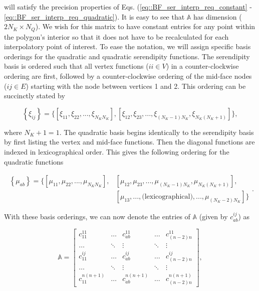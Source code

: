 \noindent will satisfy the precision properties of Eqs. (\ref{eq::BF_ser_interp_req_constant} - \ref{eq::BF_ser_interp_req_quadratic}). It is easy to see that $\mathbb{A}$ has dimension ($2 N_K \times N_Q$). We wish for this matrix to have constant entries for any point within the polygon's interior so that it does not have to be recalculated for each interpolatory point of interest. To ease the notation, we will assign specific basis orderings for the quadratic and quadratic serendipity functions. The serendipity basis is ordered such that all vertex functions ($ii \in V$) in a counter-clockwise ordering are first, followed by a counter-clockwise ordering of the mid-face nodes ($ij \in E$) starting with the node between vertices 1 and 2. This ordering can be succinctly stated by

\begin{equation}
\label{eq::BF_ser_ordering}
\left\{ \xi_{ij} \right\} = \Big\{ \left[  \xi_{11}, \xi_{22}, ... , \xi_{N_K N_K} \right] , \left[ \xi_{12}, \xi_{23}, ..., \xi_{(N_K-1)N_K}, \xi_{N_K(N_K+1)} \right] \Big\} ,
\end{equation}

\noindent where $N_K+1=1$. The quadratic basis begins identically to the serendipity basis by first listing the vertex and mid-face functions. Then the diagonal functions are indexed in lexicographical order. This gives the following ordering for the quadratic functions

\begin{equation}
\label{eq::BF_quad_ordering}
\begin{aligned}
\left\{ \mu_{ab} \right\} = \Big\{ \left[  \mu_{11}, \mu_{22}, ... , \mu_{N_K N_K} \right] , &\left[ \mu_{12}, \mu_{23}, ..., \mu_{(N_K-1)N_K}, \mu_{N_K(N_K+1)} \right] ,\\ 
&\left[ \mu_{13}, ..., \text{(lexicographical)} ,..., \mu_{(N_K-2)N_K} \right] \Big\} 
\end{aligned} .
\end{equation}

\noindent With these basis orderings, we can now denote the entries of $\mathbb{A}$ (given by $c_{ab}^{ij}$) as

\begin{equation}
\label{eq::BF_quad_to_ser_matrix_constraints}
\mathbb{A} = 
\left[
\begin{array}{ccccc}
c_{11}^{11} & \ldots & c_{ab}^{11} & \ldots & c_{(n-2)n}^{11} \\
\ldots&\ddots&\vdots&\ddots&\vdots \\
c_{11}^{ij} & \ldots & c_{ab}^{ij} & \ldots & c_{(n-2)n}^{ij} \\
\ldots&\ddots&\vdots&\ddots&\vdots \\
c_{11}^{n(n+1)} & \ldots & c_{ab}^{n(n+1)} & \ldots & c_{(n-2)n}^{n(n+1)} 
\end{array}
\right] ,
\end{equation}

